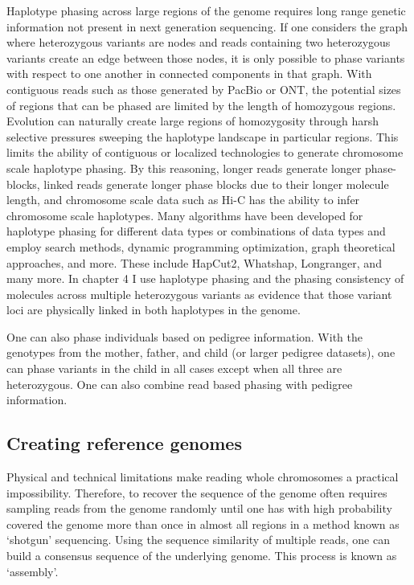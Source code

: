 \par{
Haplotype phasing across large regions of the genome requires long range genetic information not present in next generation sequencing. If one considers the graph where heterozygous variants are nodes and reads containing two heterozygous variants create an edge between those nodes, it is only possible to phase variants with respect to one another in connected components in that graph. With contiguous reads such as those generated by PacBio or ONT, the potential sizes of regions that can be phased are limited by the length of homozygous regions. Evolution can naturally create large regions of homozygosity through harsh selective pressures sweeping the haplotype landscape in particular regions\cite{homozygosity}. This limits the ability of contiguous or localized technologies to generate chromosome scale haplotype phasing. By this reasoning, longer reads generate longer phase-blocks, linked reads generate longer phase blocks due to their longer molecule length, and chromosome scale data such as Hi-C has the ability to infer chromosome scale haplotypes\cite{falconphase}. Many algorithms have been developed for haplotype phasing for different data types or combinations of data types and employ search methods, dynamic programming optimization, graph theoretical approaches, and more. These include HapCut2\cite{hapcut2}, Whatshap\cite{whatshap}, Longranger\cite{10xlinked}, and many more. In chapter 4 I use haplotype phasing and the phasing consistency of molecules across multiple heterozygous variants as evidence that those variant loci are physically linked in both haplotypes in the genome.
} 
\par{
One can also phase individuals based on pedigree information. With the genotypes from the mother, father, and child (or larger pedigree datasets), one can phase variants in the child in all cases except when all three are heterozygous\cite{phasingreview}. One can also combine read based phasing with pedigree information\cite{Garg2016}.
}

\subsection{Creating reference genomes}

\par{
Physical and technical limitations make reading whole chromosomes a practical impossibility. Therefore, to recover the sequence of the genome often requires sampling reads from the genome randomly until one has with high probability covered the genome more than once in almost all regions\cite{LanderWaterman} in a method known as `shotgun' sequencing. Using the sequence similarity of multiple reads, one can build a consensus sequence of the underlying genome. This process is known as `assembly'.
} 

